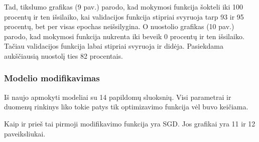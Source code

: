 \documentclass{VUMIFPSkursinis}
\begin{document}
Tad, tikslumo grafikas (9 pav.) parodo, kad mokymosi funkcija šokteli iki 100 procentų ir ten išsilaiko, kai validacijos funkcija stipriai svyruoja tarp 93 ir 95 procentų, bet per visas epochas neišsilygina.
O nuostolio grafikas (10 pav.) parodo, kad mokymosi funkcija nukrenta iki beveik 0 procentų ir ten išsilaiko. Tačiau validacijos funkcija labai stipriai svyruoja ir didėja. Pasiekdama aukščiausią nuostolį ties 82 procentais.

\subsubsection{Modelio modifikavimas}
Iš naujo apmokyti modeliai su 14 papildomų sluoksnių. Visi parametrai ir duomenų rinkinys liko tokie patys tik optimizavimo funkcija vėl buvo keičiama.

Kaip ir prieš tai pirmoji modifikavimo funkcija yra SGD. Jos grafikai yra 11 ir 12 paveiksliukai.
\end{document}
